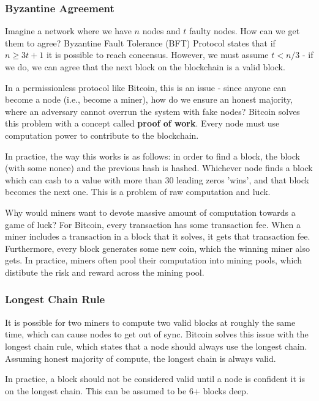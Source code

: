 \subsubsection{Byzantine Agreement}
Imagine a network where we have $n$ nodes and $t$ faulty nodes. How can we get them to agree? Byzantine Fault Tolerance (BFT) Protocol states that if $n \ge 3t + 1$ it is possible to reach concensus. However, we must assume $t < n/3$ - if we do, we can agree that the next block on the blockchain is a valid block. 

In a permissionless protocol like Bitcoin, this is an issue - since anyone can become a node (i.e., become a miner), how do we ensure an honest majority, where an adversary cannot overrun the system with fake nodes? Bitcoin solves this problem with a concept called \textbf{proof of work}. Every node must use computation power to contribute to the blockchain.

In practice, the way this works is as follows: in order to find a block, the block (with some nonce) and the previous hash is hashed. Whichever node finds a block which can cash to a value with more than 30 leading zeros 'wins', and that block becomes the next one. This is a problem of raw computation and luck.

Why would miners want to devote massive amount of computation towards a game of luck? For Bitcoin, every transaction has some transaction fee. When a miner includes a transaction in a block that it solves, it gets that transaction fee. Furthermore, every block generates some new coin, which the winning miner also gets. In practice, miners often pool their computation into mining pools, which distibute the risk and reward across the mining pool.


\subsubsection{Longest Chain Rule}
It is possible for two miners to compute two valid blocks at roughly the same time, which can cause nodes to get out of sync. Bitcoin solves this issue with the longest chain rule, which states that a node should always use the longest chain. Assuming honest majority of compute, the longest chain is always valid.

In practice, a block should not be considered valid until a node is confident it is on the longest chain. This can be assumed to be 6+ blocks deep.

